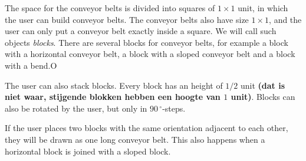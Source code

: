 The space for the conveyor belts is divided into squares of $1 \times 1$ unit, in which the user can build conveyor belts. The conveyor belts also have size $1 \times 1$, and the user can only put a conveyor belt exactly inside a square. We will call such objects \textit{blocks}. There are several blocks for conveyor belts, for example a block with a horizontal conveyor belt, a block with a sloped conveyor belt and a block with a bend.O

The user can also stack blocks. Every block has an height of $1/2$ unit \textbf{(dat is niet waar, stijgende blokken hebben een hoogte van $1$ unit)}. Blocks can also be rotated by the user, but only in $90\,^\circ$-steps.

If the user places two blocks with the same orientation adjacent to each other, they will be drawn as one long conveyor belt. This also happens when a horizontal block is joined with a sloped block.